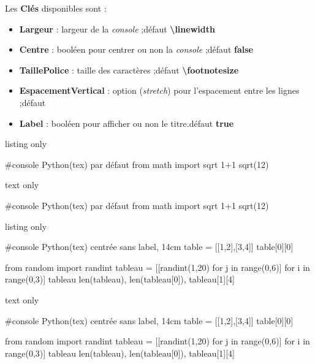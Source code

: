 \documentclass[a4paper,french,11pt]{article}
\newcommand\Cle[1]{{\bfseries\sffamily\textlangle #1\textrangle}}
\begin{document}
\begin{cautionblock}
Les \Cle{Clés} disponibles sont :

\begin{itemize}
	\item \Cle{Largeur} : largeur de la \textit{console} ;\hfill{}défaut \Cle{\textbackslash linewidth}
	\item \Cle{Centre} : booléen pour centrer ou non la \textit{console} ;\hfill{}défaut \Cle{false}
	\item \Cle{TaillePolice} : taille des caractères ;\hfill{}défaut \Cle{\textbackslash footnotesize}
	\item \Cle{EspacementVertical} : option (\textit{stretch}) pour l'espacement entre les lignes ;\hfill{}défaut \Cle{1}
	\item \Cle{Label} : booléen pour afficher ou non le titre.\hfill{}défaut \Cle{true}
\end{itemize}
\vspace*{-\baselineskip}\leavevmode
\end{cautionblock}

\begin{PresCodeTexPL}{listing only}
\begin{ConsolePythontex}{}
	#console Python(tex) par défaut
	from math import sqrt
	1+1
	sqrt(12)
\end{ConsolePythontex}
\end{PresCodeTexPL}

\begin{PresCodeSortiePL}{text only}
\smallskip
\begin{ConsolePythontex}{}
	#console Python(tex) par défaut
	from math import sqrt
	1+1
	sqrt(12)
\end{ConsolePythontex}
\end{PresCodeSortiePL}

\begin{PresCodeTexPL}{listing only}
\begin{ConsolePythontex}[Largeur=14cm,Label=false,Centre]{}
	#console Python(tex) centrée sans label, 14cm
	table = [[1,2],[3,4]]
	table[0][0]
	
	from random import randint
	tableau = [[randint(1,20) for j in range(0,6)] for i in range(0,3)]
	tableau
	len(tableau), len(tableau[0]), tableau[1][4]
\end{ConsolePythontex}
\end{PresCodeTexPL}

\begin{PresCodeSortiePL}{text only}
\smallskip
\begin{ConsolePythontex}[Largeur=14cm,Label=false,Centre]{}
	#console Python(tex) centrée sans label, 14cm
	table = [[1,2],[3,4]]
	table[0][0]
	
	from random import randint
	tableau = [[randint(1,20) for j in range(0,6)] for i in range(0,3)]
	tableau
	len(tableau), len(tableau[0]), tableau[1][4]
\end{ConsolePythontex}
\end{PresCodeSortiePL}
\end{document}
